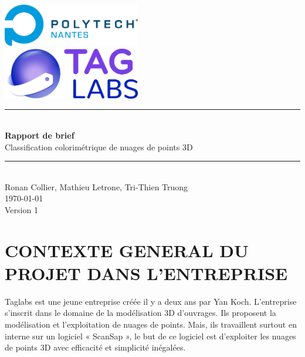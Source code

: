 \documentclass[12pt,titlepage]{report}
\begin{document}
\renewcommand{\thesection}{\arabic{section}} %

\begin{titlepage}
\newcommand{\HRule}{\rule{\linewidth}{0.5mm}}
\center

	\includegraphics[width=0.45\textwidth]{./image2.png}\\[1cm]
   
	\includegraphics[width=0.45\textwidth]{./image1.png}


\HRule \\[0.4cm]
{ \huge \bfseries Rapport de brief \\[0.15cm] }
Classification colorimétrique de nuages de points 3D
\HRule \\[1.5cm]
Ronan Collier,
Mathieu Letrone,
Tri-Thien Truong
\\[1cm]
\today \\ [1cm]
Version 1
\end{titlepage}
\vspace{\baselineskip}



\vspace{\baselineskip}

\section{CONTEXTE GENERAL DU PROJET DANS L’ENTREPRISE}

\vspace{\baselineskip}
\begin{justify}
Taglabs est une jeune entreprise créée il y a deux ans par Yan Koch. L’entreprise s’inscrit dans le domaine de la modélisation 3D d’ouvrages. Ils proposent la modélisation et l’exploitation de nuages de points. Mais, ils travaillent surtout en interne sur un logiciel « ScanSap », le but de ce logiciel est d’exploiter les nuages de points 3D avec efficacité et simplicité inégalées.
\end{justify}\par
\end{document}
